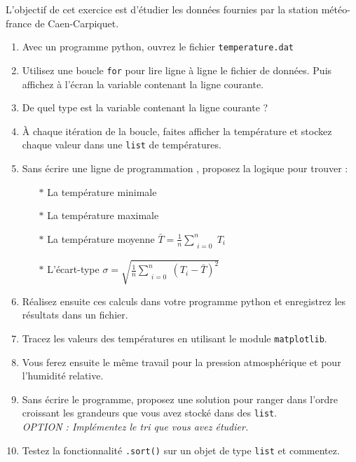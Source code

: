 L'objectif de cet exercice est d'étudier les données fournies par la station météo-france
de Caen-Carpiquet.
\begin{enumerate}
\item Avec un programme python, ouvrez le fichier \texttt{temperature.dat}

\item Utilisez une boucle \texttt{for} pour lire ligne à ligne le fichier de données.
  Puis affichez à l'écran la variable contenant la ligne courante.

\item De quel type est la variable contenant la ligne courante ?


\item À chaque itération de la boucle, faites afficher la température et stockez chaque valeur dans une \texttt{list} de températures.

\item Sans écrire une ligne de programmation , proposez la logique pour trouver :
  \begin{itemize}
  \item[$\ast$] La température minimale
  \item[$\ast$] La température maximale
  \item[$\ast$] La température moyenne    $ \bar{T}= \frac{1}{n}  \sum\limits_{\substack{i=0}}^{n}{T_i}$
  \item[$\ast$] L'écart-type  $\sigma = \sqrt{\frac{1}{n}  \sum\limits_{\substack{i=0}}^{n}{} (T_i-\bar{T})^2   }$
  \end{itemize}

\item Réalisez ensuite ces calculs dans votre programme python et enregistrez les résultats dans un fichier.

\item Tracez les valeurs des températures en utilisant le module \texttt{matplotlib}.

\item Vous ferez ensuite le même travail pour la pression atmosphérique et pour l'humidité relative.

\item Sans écrire le programme, proposez une solution pour ranger dans l'ordre croissant
  les grandeurs que vous avez stocké dans des \texttt{list}.\\
  \textit{OPTION : Implémentez le tri que vous avez étudier.}

\item Testez la fonctionnalité \texttt{.sort()} sur un objet de type \texttt{list} et commentez.

\end{enumerate}
